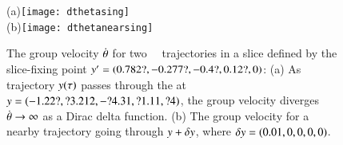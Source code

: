 


 \begin{figure}
(a)\texttt{[image: dthetasing]}
\\
(b)\texttt{[image: dthetanearsing]}%
 \caption{\label{fig:dthetasing}
The group velocity $\dot{{\bf \theta}}$ for two \cLf\
\reducedsp\ trajectories in a slice defined by the slice-fixing
point ${y'}=(0.782?,-0.277?,-0.4?,0.12?,0)$:
 (a) As trajectory $y(\tau)$ passes through the
{\sset} 
 at $y=(-1.22?, ?3.212, -?4.31, ?1.11, ?4)$,
the group velocity diverges
$\dot{{\bf \theta}} \to \infty$ as a Dirac delta function.
(b) The group velocity for a nearby trajectory going
through $y+\delta y$,
where $\delta y=(0.01,0,0,0,0)$.
 }%
 \end{figure}

